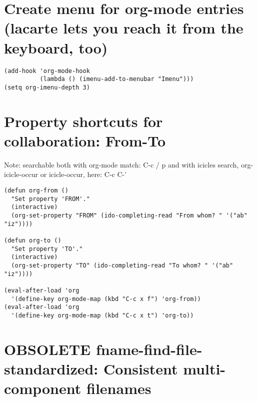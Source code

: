 \documentclass[10pt]{article}
\begin{document}
\section{Create menu for org-mode entries (lacarte lets you reach it from the keyboard, too)}
\label{sec-16}

\begin{verbatim}
(add-hook 'org-mode-hook
          (lambda () (imenu-add-to-menubar "Imenu")))
(setq org-imenu-depth 3)
\end{verbatim}

\section{Property shortcuts for collaboration: From-To}
\label{sec-17}

Note: searchable both with org-mode match: C-c / p and with icicles search,
org-icicle-occur or icicle-occur, here: C-c C-'

\begin{verbatim}
(defun org-from ()
  "Set property 'FROM'."
  (interactive)
  (org-set-property "FROM" (ido-completing-read "From whom? " '("ab" "iz"))))

(defun org-to ()
  "Set property 'TO'."
  (interactive)
  (org-set-property "TO" (ido-completing-read "To whom? " '("ab" "iz"))))

(eval-after-load 'org
  '(define-key org-mode-map (kbd "C-c x f") 'org-from))
(eval-after-load 'org
  '(define-key org-mode-map (kbd "C-c x t") 'org-to))
\end{verbatim}

\section{{\bfseries\sffamily OBSOLETE} fname-find-file-standardized: Consistent multi-component filenames}
\label{sec-18}
\end{document}
